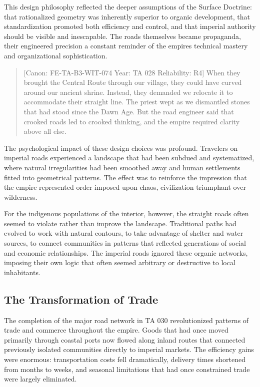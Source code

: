 This design philosophy reflected the deeper assumptions of the Surface
Doctrine: that rationalized geometry was inherently superior to organic
development, that standardization promoted both efficiency and control,
and that imperial authority should be visible and inescapable. The roads
themselves became propaganda, their engineered precision a constant
reminder of the empire\textquotesingle s technical mastery and
organizational sophistication.

\begin{quote}
{[}Canon: FE-TA-B3-WIT-074 \textbar{} Year: TA 028 \textbar{}
Reliability: R4{]} When they brought the Central Route through our
village, they could have curved around our ancient shrine. Instead, they
demanded we relocate it to accommodate their straight line. The priest
wept as we dismantled stones that had stood since the Dawn Age. But the
road engineer said that crooked roads led to crooked thinking, and the
empire required clarity above all else.
\end{quote}

The psychological impact of these design choices was profound. Travelers
on imperial roads experienced a landscape that had been subdued and
systematized, where natural irregularities had been smoothed away and
human settlements fitted into geometrical patterns. The effect was to
reinforce the impression that the empire represented order imposed upon
chaos, civilization triumphant over wilderness.

For the indigenous populations of the interior, however, the straight
roads often seemed to violate rather than improve the landscape.
Traditional paths had evolved to work with natural contours, to take
advantage of shelter and water sources, to connect communities in
patterns that reflected generations of social and economic
relationships. The imperial roads ignored these organic networks,
imposing their own logic that often seemed arbitrary or destructive to
local inhabitants.

\subsection{The Transformation of
Trade}\label{the-transformation-of-trade-1}

The completion of the major road network in TA 030 revolutionized
patterns of trade and commerce throughout the empire. Goods that had
once moved primarily through coastal ports now flowed along inland
routes that connected previously isolated communities directly to
imperial markets. The efficiency gains were enormous: transportation
costs fell dramatically, delivery times shortened from months to weeks,
and seasonal limitations that had once constrained trade were largely
eliminated.

